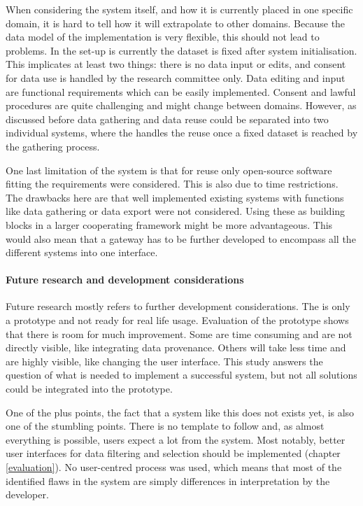 When considering the system itself, and how it is currently placed in one specific domain, it is hard to tell how it will extrapolate to other domains.
Because the data model of the implementation is very flexible, this should not lead to problems.
In the set-up is currently the dataset is fixed after system initialisation.
This implicates at least two things: there is no data input or edits, and consent for data use is handled by the research committee only.
Data editing and input are functional requirements which can be easily implemented.
Consent and lawful procedures are quite  challenging and might change between domains.
However, as discussed before data gathering and data reuse could be separated into two individual systems, 
where the \ivfsystem{} handles the reuse once a fixed dataset is reached by the gathering process.

One last limitation of the system is that for reuse only open-source software fitting the requirements were considered.
This is also due to time restrictions.
The drawbacks here are that well implemented existing systems with functions like data gathering or data export were not considered.
Using these as building blocks in a larger cooperating framework might be more advantageous.
This would also mean that a gateway has to be further developed to encompass all the different systems into one interface.

\paragraph{Future research and development considerations}
Future research mostly refers to further development considerations.
The \ivfsystem{} is only a prototype and not ready for real life usage.
Evaluation of the prototype shows that there is room for much improvement.
Some are time consuming and are not directly visible, like integrating data provenance.
Others will take less time and are highly visible, like changing the user interface.
This study answers the question of what is needed to implement a successful system, but not all solutions could be integrated into the prototype.

One of the plus points, the fact that a system like this does not exists yet, is also one of the stumbling points.
There is no template to follow and, as almost everything is possible, users expect a lot from the system.
Most notably, better user interfaces for data filtering and selection should be implemented (chapter \ref{evaluation}).
No user-centred process was used, which means that most of the identified flaws in the system are simply differences in interpretation by the developer.

